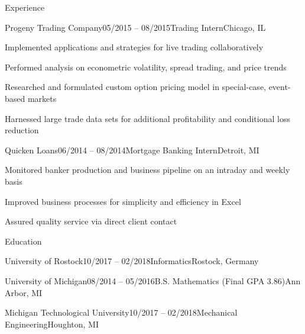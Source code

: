 \documentclass{resume}
\begin{document}
\begin{cvSection}{Experience}
        \begin{cvSubsection}{Progeny Trading Company}{05/2015 -- 08/2015}{Trading Intern}{Chicago, IL}
            \item Implemented applications and strategies for live trading collaboratively
            \item Performed analysis on econometric volatility, spread trading, and price trends
            \item Researched and formulated custom option pricing model in special-case, event-based markets
            \item Harnessed large trade data sets for additional profitability and conditional loss reduction
        \end{cvSubsection}

        \begin{cvSubsection}{Quicken Loans}{06/2014 -- 08/2014}{Mortgage Banking Intern}{Detroit, MI}
            \item Monitored banker production and business pipeline on an intraday and weekly basis
            \item Improved business processes for simplicity and efficiency in Excel
            \item Assured quality service via direct client contact
        \end{cvSubsection}

    \end{cvSection}

    \begin{cvSection}{Education}

        \begin{cvSubsection}{University of Rostock}{10/2017 -- 02/2018}{Informatics}{Rostock, Germany}
        \end{cvSubsection}

        \begin{cvSubsection}{University of Michigan}{08/2014 -- 05/2016}{B.S. Mathematics (Final GPA 3.86)}{Ann Arbor, MI}
        \end{cvSubsection}

        \begin{cvSubsection}{Michigan Technological University}{10/2017 -- 02/2018}{Mechanical Engineering}{Houghton, MI}
        \end{cvSubsection}

    \end {cvSection}
\end{document}
